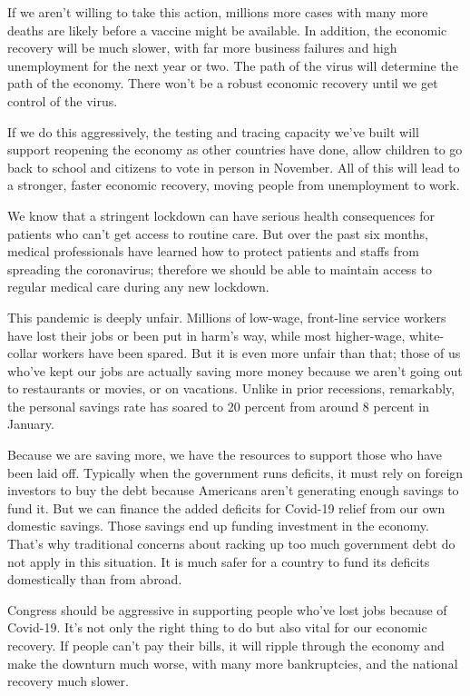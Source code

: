 If we aren't willing to take this action, millions more cases with many
more deaths are likely before a vaccine might be available. In addition,
the economic recovery will be much slower, with far more business
failures and high unemployment for the next year or two. The path of the
virus will determine the path of the economy. There won't be a robust
economic recovery until we get control of the virus.

If we do this aggressively, the testing and tracing capacity we've built
will support reopening the economy as other countries have done, allow
children to go back to school and citizens to vote in person in
November. All of this will lead to a stronger, faster economic recovery,
moving people from unemployment to work.

We know that a stringent lockdown can have serious health consequences
for patients who can't get access to routine care. But over the past six
months, medical professionals have learned how to protect patients and
staffs from spreading the coronavirus; therefore we should be able to
maintain access to regular medical care during any new lockdown.

This pandemic is deeply unfair. Millions of low-wage, front-line service
workers have lost their jobs or been put in harm's way, while most
higher-wage, white-collar workers have been spared. But it is even more
unfair than that; those of us who've kept our jobs are actually saving
more money because we aren't going out to restaurants or movies, or on
vacations. Unlike in prior recessions, remarkably, the personal savings
rate has soared to 20 percent from around 8 percent in January.

Because we are saving more, we have the resources to support those who
have been laid off. Typically when the government runs deficits, it must
rely on foreign investors to buy the debt because Americans aren't
generating enough savings to fund it. But we can finance the added
deficits for Covid-19 relief from our own domestic savings. Those
savings end up funding investment in the economy. That's why traditional
concerns about racking up too much government debt do not apply in this
situation. It is much safer for a country to fund its deficits
domestically than from abroad.

Congress should be aggressive in supporting people who've lost jobs
because of Covid-19. It's not only the right thing to do but also vital
for our economic recovery. If people can't pay their bills, it will
ripple through the economy and make the downturn much worse, with many
more bankruptcies, and the national recovery much slower.

